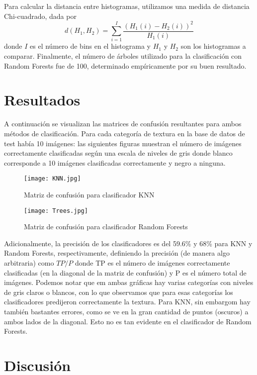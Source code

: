 \documentclass[10pt,twocolumn,letterpaper]{article}
\begin{document}
Para calcular la distancia entre histogramas, utilizamos una medida de distancia Chi-cuadrado, dada por
$$
d(H_1,H_2) = \sum_{i=1}^I \frac{(H_1(i)-H_2(i))^2}{H_1(i)}
$$
donde $I$ es el número de bins en el histograma y $H_1$ y $H_2$ son los histogramas a comparar. 
Finalmente, el número de árboles utilizado para la clasificación con Random Forests fue de 100, determinado empíricamente por su buen resultado.

\section{Resultados}

A continuación se visualizan las matrices de confusión resultantes para ambos métodos de clasificación. Para cada categoría de textura en la base de datos de test había 10 imágenes: las siguientes figuras muestran el número de imágenes correctamente clasificadas según una escala de niveles de gris donde blanco corresponde a 10 imágenes clasificadas correctamente y negro a ninguna. 
\begin{figure}[H]
\centering
\texttt{[image: KNN.jpg]}
\caption{Matriz de confusión para clasificador KNN}
\end{figure}

\begin{figure}[H]
\centering
\texttt{[image: Trees.jpg]}
\caption{Matriz de confusión para clasificador Random Forests}
\end{figure}

Adicionalmente, la precisión de los clasificadores es del 59.6\% y 68\% para KNN y Random Forests, respectivamente, definiendo la precisión (de manera algo arbitraria) como $TP/P$ donde TP es el número de imágenes correctamente clasificadas (en la diagonal de la matriz de confusión) y P es el número total de imágenes. Podemos notar que em ambas gráficas hay varias categorías con niveles de gris claros o blancos, con lo que observamos que para esas categorías los clasificadores predijeron correctamente la textura. Para KNN, sin embargom hay también bastantes errores, como se ve en la gran cantidad de puntos (oscuros) a ambos lados de la diagonal. Esto no es tan evidente en el clasificador de Random Forests. 


\section{Discusión}
\end{document}
